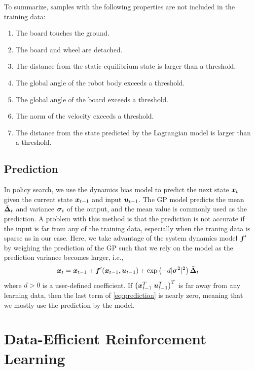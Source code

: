 \documentclass[letterpaper, 10 pt, conference]{ieeeconf}
\begin{document}
To summarize, samples with the following properties are not included in
the training data:
\begin{enumerate}
\item The board touches the ground.
\item The board and wheel are detached.
\item The distance from the static equilibrium state is larger than a
	  threshold.
\item The global angle of the robot body exceeds a threshold.
\item The global angle of the board exceeds a threshold.
\item The norm of the velocity exceeds a threshold.
\item The distance from the state predicted by the Lagrangian model is
	  larger than a threshold.
\end{enumerate}


\subsection{Prediction}

In policy search, we use the dynamics bias model to predict the next
state $\mbox{\boldmath \(x\)}_t$ given the current state $\mbox{\boldmath \(x\)}_{t-1}$ and input
$\mbox{\boldmath \(u\)}_{t-1}$.
The GP model predicts the mean
$\bar{\mbox{\boldmath \(\Delta\)}}_t$ and variance $\mbox{\boldmath \(\sigma\)}_t$ of the
output, and the mean value is commonly used as the prediction.
A problem with this method is that the prediction is not accurate if the
input is far from any of the training data, especially when the traning
data is sparse as in our case.
Here, we take advantage of the system dynamics model $\mbox{\boldmath \(f\)}'$ by
weighing the prediction of the GP such that we rely on the model as the
prediction variance becomes larger, i.e.,
\begin{equation}
\mbox{\boldmath \(x\)}_t = \mbox{\boldmath \(x\)}_{t-1} + \mbox{\boldmath \(f\)}'(\mbox{\boldmath \(x\)}_{t-1}, \mbox{\boldmath \(u\)}_{t-1}) +
 \exp\left( -d |\mbox{\boldmath \(\sigma\)}^2|^2\right) \bar{\mbox{\boldmath \(\Delta\)}}_t
\label{eq:learning_prediction}
\end{equation}
where $d>0$ is a user-defined coefficient.
If $\left(\mbox{\boldmath \(x\)}_{t-1}^T\;\mbox{\boldmath \(u\)}_{t-1}^T\right)^T$ is far away
from any learning data, then the last term of \eqref{eq:prediction} is
nearly zero, meaning that we mostly use the prediction by the model.

\section{Data-Efficient Reinforcement Learning} \label{sec:learning_policy-optim}
\end{document}
